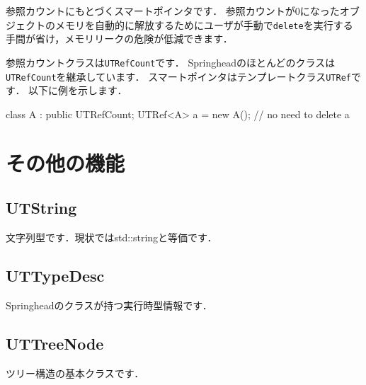 
\KLUDGE 参照カウントにもとづくスマートポインタです．
\KLUDGE 参照カウントが$0$\KLUDGE になったオブジェクトのメモリを自動的に解放するためにユーザが手動で\texttt{delete}\KLUDGE を実行する手間が省け，メモリリークの危険が低減できます．

\KLUDGE 参照カウントクラスは\texttt{UTRefCount}\KLUDGE です．
Springhead\KLUDGE のほとんどのクラスは\texttt{UTRefCount}\KLUDGE を継承しています．
\KLUDGE スマートポインタはテンプレートクラス\texttt{UTRef}\KLUDGE です．
\KLUDGE 以下に例を示します．

\begin{sourcecode}
class A : public UTRefCount{};
UTRef<A> a = new A();
// no need to delete a
\end{sourcecode}

\section{\KLUDGE その他の機能}

\subsection*{UTString}

\KLUDGE 文字列型です．現状ではstd::string\KLUDGE と等価です．

\subsection*{UTTypeDesc}

Springhead\KLUDGE のクラスが持つ実行時型情報です．

\subsection*{UTTreeNode}

\KLUDGE ツリー構造の基本クラスです．

